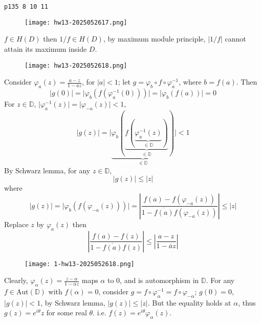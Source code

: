 \begin{lstlisting}
p135 8 10 11
\end{lstlisting}
\begin{exercise}
\begin{figure}[H]
\centering
\texttt{[image: hw13-2025052617.png]}
\label{}
\end{figure}
\end{exercise}
$f\in H(D)$ then $1/f\in H(D)$, by maximum module principle, $\lvert 1/f \rvert$ cannot attain its maximum inside $D$.

\begin{exercise}
\begin{figure}[H]
\centering
\texttt{[image: hw13-2025052618.png]}
\label{}
\end{figure}
\end{exercise}
Consider $\varphi_{a}(z)=\frac{a-z}{1-\overline{a}z}$, for $\lvert a \rvert<1$; let $g=\varphi_{b}\circ f\circ\varphi _a^{-1}$, where $b=f(a)$. Then
\[
\lvert g(0) \rvert =\lvert \varphi_{b}(f(\varphi_{a}^{-1}(0))) \rvert =\lvert \varphi_{b}(f(a)) \rvert =0
\]
For $z\in \mathbb{D}$, $\lvert \varphi_{a}^{-1}(z) \rvert=\lvert \varphi_{-a}(z) \rvert<1$,
\[
\lvert g(z) \rvert =\lvert \underbrace{ \varphi_{b}(\underbrace{ f(\underbrace{ \varphi_{a}^{-1}(z) }_{ \in \mathbb{D} }) }_{ \in \mathbb{D} }) }_{ \in \mathbb{D} } \rvert <1
\]
By Schwarz lemma, for any $z\in \mathbb{D}$,
\[
\lvert g(z) \rvert \leq \lvert z \rvert 
\]
where
\[
\lvert g(z) \rvert =\lvert \varphi_{b}(f(\varphi_{-a}(z))) \rvert =\left\lvert  \frac{f(a)-f(\varphi_{-a}(z))}{1-\overline{f(a)}f(\varphi_{-a}(z))}  \right\rvert \leq \lvert z \rvert
\]
Replace $z$ by $\varphi_{a}(z)$ then
\[
\left\lvert  \frac{f(a)-f(z)}{1-\overline{f(a)}f(z)}  \right\rvert \leq \left\lvert  \frac{a-z}{1-\overline{a}z}  \right\rvert
\]
\begin{exercise}
\begin{figure}[H]
\centering
\texttt{[image: 1-hw13-2025052618.png]}
\label{}
\end{figure}
\end{exercise}
Clearly, $\varphi_{\alpha}(z)=\frac{z-\alpha}{1-\overline{\alpha}z}$ maps $\alpha$ to 0, and is automorphism in $\mathbb{D}$. For any $f\in \mathrm{Aut}(\mathbb{D})$ with $f(\alpha)=0$, consider $g=f\circ\varphi_{\alpha}^{-1}=f\circ\varphi_{-\alpha}$; $g(0)=0$, $\lvert g(z) \rvert<1$, by Schwarz lemma, $\lvert g(z) \rvert\leq \lvert z \rvert$. But the equality holds at $\alpha$, thus $g(z)=e^{ i\theta }z$ for some real $\theta$. i.e. $f(z)=e^{ i\theta }\varphi_{\alpha}(z)$.
